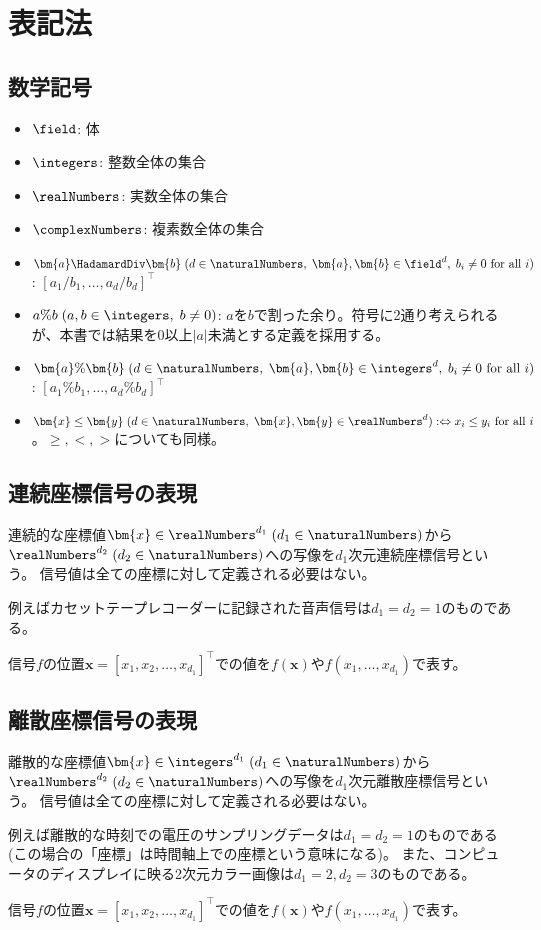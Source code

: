 \part{表記法}
	\chapter{数学記号}
		\begin{itemize}
			\item $\field$: 体
			\item $\integers$: 整数全体の集合
			\item $\realNumbers$: 実数全体の集合
			\item $\complexNumbers$: 複素数全体の集合
			\item $\bm{a} \HadamardDiv \bm{b}\;(d \in \naturalNumbers,\;\bm{a},\bm{b} \in \field^d,\;b_i\neq 0 \text{ for all }i)$: $[a_1/b_1,\dots,a_d/b_d]^\top$
			\item $a\%b\;(a,b\in\integers,\;b\neq 0)$: $a$を$b$で割った余り。符号に2通り考えられるが、本書では結果を0以上$|a|$未満とする定義を採用する。
			\item $\bm{a}\%\bm{b}\;(d\in\naturalNumbers,\;\bm{a},\bm{b} \in \integers^d,\; b_i\neq 0 \text{ for all }i)$: $[a_1\%b_1,\dots,a_d\%b_d]^\top$
			\item $\bm{x} \leq \bm{y}\;(d\in\naturalNumbers,\;\bm{x},\bm{y} \in \realNumbers^d) :\Leftrightarrow x_i \leq y_i \text{ for all }i$。$\geq, <, >$についても同様。
		\end{itemize}

	\chapter{連続座標信号の表現}
		連続的な座標値$\bm{x}\in\realNumbers^{d_1}\;(d_1\in\naturalNumbers)$から$\realNumbers^{d_2}\;(d_2\in\naturalNumbers)$への写像を$d_1$次元連続座標信号という。
		信号値は全ての座標に対して定義される必要はない。
		\par
		例えばカセットテープレコーダーに記録された音声信号は$d_1=d_2=1$のものである。
		\par
		信号$f$の位置$\bm{x} = [x_1,x_2,\dots,x_{d_1}]^\top$での値を$f(\bm{x})$や$f(x_1,\dots,x_{d_1})$で表す。

	\chapter{離散座標信号の表現}
		離散的な座標値$\bm{x}\in\integers^{d_1}\;(d_1\in\naturalNumbers)$から$\realNumbers^{d_2}\;(d_2\in\naturalNumbers)$への写像を$d_1$次元離散座標信号という。
		信号値は全ての座標に対して定義される必要はない。
		\par
		例えば離散的な時刻での電圧のサンプリングデータは$d_1=d_2=1$のものである(この場合の「座標」は時間軸上での座標という意味になる)。
		また、コンピュータのディスプレイに映る2次元カラー画像は$d_1=2,d_2=3$のものである。
		\par
		信号$f$の位置$\bm{x} = [x_1,x_2,\dots,x_{d_1}]^\top$での値を$f(\bm{x})$や$f(x_1,\dots,x_{d_1})$で表す。
